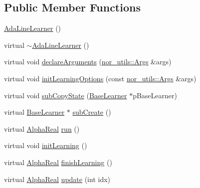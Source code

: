 \subsection*{Public Member Functions}
\begin{DoxyCompactItemize}
\item 
\hyperlink{classMultiBoost_1_1AdaLineLearner_ac13de8e5e86032b6d9e58eae860e4b8b}{Ada\-Line\-Learner} ()
\item 
virtual \hyperlink{classMultiBoost_1_1AdaLineLearner_adb36b069fcaede6a71d442151b1eb716}{$\sim$\-Ada\-Line\-Learner} ()
\item 
virtual void \hyperlink{classMultiBoost_1_1AdaLineLearner_a6c8f143382449c333995c33539bbff04}{declare\-Arguments} (\hyperlink{classnor__utils_1_1Args}{nor\-\_\-utils\-::\-Args} \&args)
\item 
virtual void \hyperlink{classMultiBoost_1_1AdaLineLearner_a4af94dbbbc29009456ef3e80e104f333}{init\-Learning\-Options} (const \hyperlink{classnor__utils_1_1Args}{nor\-\_\-utils\-::\-Args} \&args)
\item 
virtual void \hyperlink{classMultiBoost_1_1AdaLineLearner_a4b96e7dce0bb66b4dbe48caef6582699}{sub\-Copy\-State} (\hyperlink{classMultiBoost_1_1BaseLearner}{Base\-Learner} $\ast$p\-Base\-Learner)
\item 
virtual \hyperlink{classMultiBoost_1_1BaseLearner}{Base\-Learner} $\ast$ \hyperlink{classMultiBoost_1_1AdaLineLearner_a440d8ba8ddb784db3caa562813c5b293}{sub\-Create} ()
\item 
virtual \hyperlink{Defaults_8h_a80184c4fd10ab70a1a17c5f97dcd1563}{Alpha\-Real} \hyperlink{classMultiBoost_1_1AdaLineLearner_aaf0781525559a349d16b8f6cb8606fcf}{run} ()
\item 
virtual void \hyperlink{classMultiBoost_1_1AdaLineLearner_a7846d9abaa274ed08c6610a6314a2333}{init\-Learning} ()
\item 
virtual \hyperlink{Defaults_8h_a80184c4fd10ab70a1a17c5f97dcd1563}{Alpha\-Real} \hyperlink{classMultiBoost_1_1AdaLineLearner_a55fc3a35c4ef3374f06c1597122f203d}{finish\-Learning} ()
\item 
virtual \hyperlink{Defaults_8h_a80184c4fd10ab70a1a17c5f97dcd1563}{Alpha\-Real} \hyperlink{classMultiBoost_1_1AdaLineLearner_a5ce3ad08d70d156c8b72cd5c8990979d}{update} (int idx)
\end{DoxyCompactItemize}
